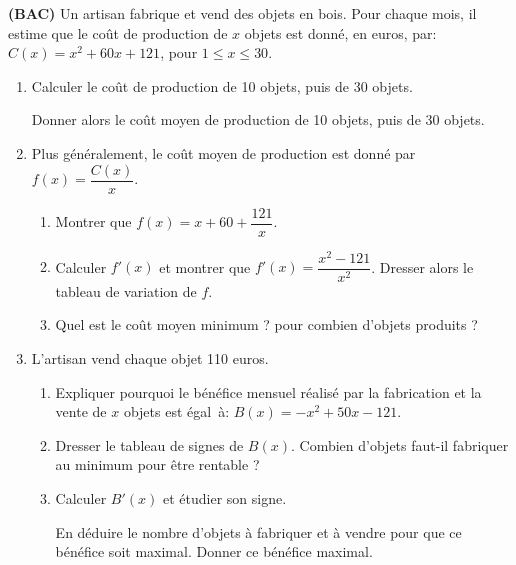 \documentclass[10pt,a4paper,openany,twoside, eleve]{book}
\begin{document}
\begin{exon} \textbf{(BAC)}
  Un artisan fabrique et vend des objets en bois.
  Pour chaque mois, il estime que le co\^ut de production de $x$ objets
  est donné, en euros, par:
  $C(x)=x^2+60x+121$,
  pour $1\leqslant x\leqslant 30$.

  \begin{enumerate}
    \item Calculer le co\^ut de production de 10 objets, puis de 30 objets.

          Donner alors le co\^ut moyen de production de 10 objets, puis de 30 objets.

    \item Plus généralement, le co\^ut moyen de production
          est donné par $f(x)=\dfrac{C(x)}{x}$.

          \begin{enumerate}[label=\alph*]
            \item Montrer que $f(x)=x+60+\dfrac{121}{x}$.
            \item Calculer $f'(x)$ et montrer que $f'(x)=\dfrac{x^2-121}{x^2}$.
                  Dresser alors le tableau de variation de $f$.

            \item Quel est le co\^ut moyen minimum ? pour combien d'objets produits ?
          \end{enumerate}

    \item L'artisan vend chaque objet 110 euros.
          \begin{enumerate}[label=\alph*]
            \item Expliquer pourquoi le bénéfice mensuel réalisé par la fabrication
                  et la vente de $x$ objets est égal~à:
                  $B(x)=-x^2+50x-121$.

            \item Dresser le tableau de signes de $B(x)$.
                  Combien d'objets faut-il fabriquer au minimum pour \^etre rentable ?

            \item Calculer $B'(x)$ et étudier son signe.

                  En déduire le nombre d'objets à fabriquer et à vendre pour que ce bénéfice
                  soit maximal.
                  Donner ce bénéfice maximal.
          \end{enumerate}

  \end{enumerate}
\end{exon}
\end{document}
